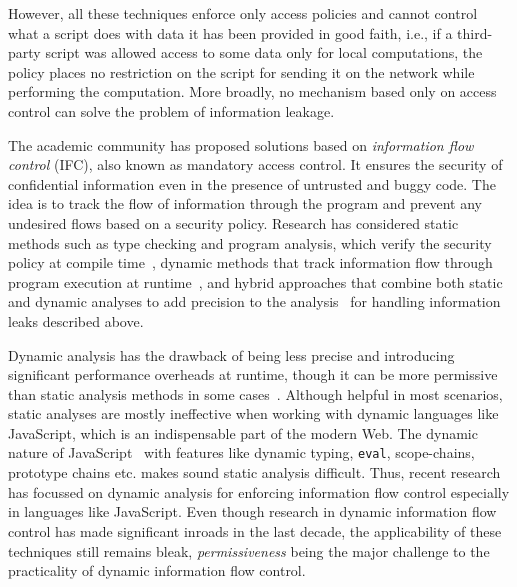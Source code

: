 However, all these techniques enforce only access policies
and cannot control what a script does with data it has been provided
in good faith, i.e., if a third-party script was allowed access to
some data only for local computations, the policy places no
restriction on the script for sending it on the network while
performing the computation. More broadly, no mechanism based only
on access control can solve the problem of information leakage.  

The academic community has proposed solutions based on
\emph{information flow control} (IFC), also known as mandatory access
control.
It ensures the security of
confidential information even in the presence of untrusted and buggy
code. The idea is to track the flow of information through the program
and prevent any undesired flows based on a security policy. 
Research has considered static methods such as type checking and
program analysis, which verify the security policy at compile
time~\cite{denning76, denning77, myersJFlow, volpano, pottier2003,
  hunt2006:types, LBIFS, hammer09ijis}, 
dynamic methods that track information flow through program execution
at runtime~\cite{fenton, plas09, plas10, Askarov09, Sabelfeld10, SME,
  csf12, austin12POPL, jeeves, plas14, cowl},    
and hybrid approaches that combine both static and dynamic analyses to add
precision to the analysis~\cite{Nentwich07, Gurvan06, Gurvan07,
  russo10CSF, vogt07NDSS, post14, csf15Hedin} 
for handling information leaks described above. 

Dynamic analysis has the drawback of being less precise and
introducing significant performance overheads at runtime, though it
can be more permissive than static analysis methods in some
cases~\cite{russo10CSF}. Although helpful in most 
scenarios, static analyses are mostly ineffective when working with
dynamic languages like JavaScript, which is an indispensable part of
the modern Web. The dynamic nature of
JavaScript~\cite{richards11ECOOP, oopsla13} with features like dynamic
typing, \texttt{eval},  scope-chains, prototype chains etc. makes sound
static analysis difficult. Thus, recent research has focussed on
dynamic analysis for enforcing information flow control especially in
languages like JavaScript. Even though research in dynamic information
flow control has made significant inroads in the last decade, the
applicability of these techniques still remains bleak, 
\emph{permissiveness} being the major challenge to
the practicality of dynamic information flow control. 

